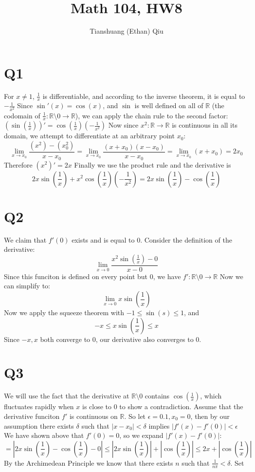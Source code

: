 \documentclass[12pt]{article}
\author{Tianshuang (Ethan) Qiu}
\newcommand{\R}{\mathbb{R}}
\begin{document}
\title{Math 104, HW8}
\maketitle
\newpage

\section{Q1}
For $x \not = 1$, $\frac{1}{x}$ is differentiable, and according to the inverse theorem, it is equal to $-\frac{1}{x^2}$
\newline
Since $\sin'(x) = \cos(x)$, and $\sin$ is well defined on all of $\R$ (the codomain of $\frac{1}{x}: \R \setminus 0 \to \R$), we can apply the chain rule to the second factor: $(\sin(\frac{1}{x}))' = \cos(\frac{1}{x})(-\frac{1}{x^2})$
\newline
Now since $x^2: \R \to \R$ is continuous in all its domain, we attempt to differentiate at an arbitrary point $x_0$:
$$\lim_{x \to x_0}\frac{(x^2)-(x_0^2)}{x-x_0} = \lim_{x \to x_0}\frac{(x+x_0)(x-x_0)}{x-x_0} = \lim_{x \to x_0}(x+x_0) = 2x_0$$
Therefore $(x^2)'=2x$
\newline
Finally we use the product rule and the derivative is $$2x\sin(\frac{1}{x}) + x^2\cos(\frac{1}{x})(-\frac{1}{x^2})= 2x\sin(\frac{1}{x})-\cos(\frac{1}{x})$$
\newpage


\section{Q2}
We claim that $f'(0)$ exists and is equal to $0$.
\newline
Consider the definition of the derivative: $$\lim_{x \to 0}\frac{x^2\sin(\frac{1}{x})-0}{x-0}$$
Since this funciton is defined on every point but 0, we have $f': \R \setminus 0 \to \R$
Now we can simplify to:
$$\lim_{x \to 0}x \sin(\frac{1}{x}) $$
Now we apply the squeeze theorem with $-1 \leq \sin(s) \leq 1$, and
$$-x \leq x \sin(\frac{1}{x}) \leq x$$
Since $-x, x$ both converge to 0, our derivative also converges to 0.
\newpage


\section{Q3}
We will use the fact that the derivative at $\R \setminus 0$ contains $\cos(\frac{1}{x})$, which fluctuates rapidly when $x$ is close to 0 to show a contradiction.
\newline
Assume that the derivative funciton $f'$ is continuous on $\R$. So let $\epsilon = 0.1, x_0=0$, then by our assumption there exists $\delta$ such that $|x-x_0|<\delta$ implies $|f'(x)-f'(0)|<\epsilon$
\newline
We have shown above that $f'(0)=0$, so we expand $|f'(x)-f'(0)|$:
$$=|2x\sin(\frac{1}{x})-\cos(\frac{1}{x})-0| \leq |2x\sin(\frac{1}{x})|+|\cos(\frac{1}{x})| \leq 2x+|\cos(\frac{1}{x})|$$
\newline
By the Archimedean Principle we know that there exists $n$ such that $\frac{1}{n\pi} < \delta$. Set 
\end{document}
